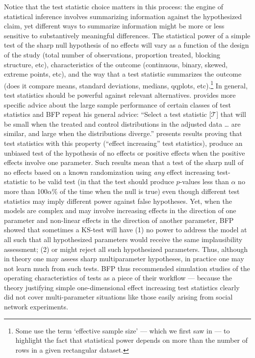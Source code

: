 Notice that the test statistic choice matters in this process: the engine of
statistical inference involves summarizing information against the
hypothesized claim, yet different ways to summarize information might be more
or less sensitive to substantively meaningful differences. The statistical
power of a simple test of the sharp null hypothesis of no effects will vary as
a function of the design of the study (total number of observations, proportion treated, blocking structure,
etc), characteristics of the outcome (continuous, binary, skewed, extreme
points, etc), and the way that a test statistic summarizes the outcome (does
it compare means, standard deviations, medians, qqplots, etc).\footnote{Some
  use the term `effective sample size' --- which we first saw in
  \citet{kish65} ---
  to highlight the fact that statistical power depends on more than the number
  of rows in a given rectangular dataset. } In general,
test statistics should be powerful against relevant alternatives. \citet[\S 2.4.4]{rosenbaum:2002} provides more specific
advice about the large sample performance of certain classes of test statistics
and BFP repeat his general advice: ``Select a test statistic [$\mathcal{T}$] that will be
small when the treated and control distributions in the adjusted data \ldots
are similar, and large when the distributions diverge.'' \cite[Proposition 4
and 5, \S 2.9]{rosenbaum:2002} presents results proving that test statistics
with this property (``effect increasing'' test statistics), produce an
unbiased test of the hypothesis of no effects or positive effects when the
positive effects involve one parameter. Such results mean that a test of
the sharp null of no effects
based on a known randomization using \emph{any} effect increasing
test-statistic to be valid test (in that the test should produce $p$-values
less than $\alpha$ no more than 100$\alpha \%$ of the time when the null is true) even though different
test statistics may imply different power against false hypotheses.  Yet, when the models are complex and
may involve increasing effects in the direction of one parameter and
non-linear effects in the direction of another parameter, BFP showed that
sometimes a KS-test will have (1) no power to address the model at all such
that all hypothesized parameters would receive the same implausibility
assessment; (2) or might reject all such hypothesized parameters. Thus,
although in theory one may assess sharp multiparameter hypotheses,
 in practice one may not learn much from such tests. BFP thus recommended simulation studies of the operating
characteristics of tests as a piece of their workflow --- because  the theory
justifying simple one-dimensional effect increasing test statistics clearly
did not cover multi-parameter situations like those easily arising from social
network experiments.

